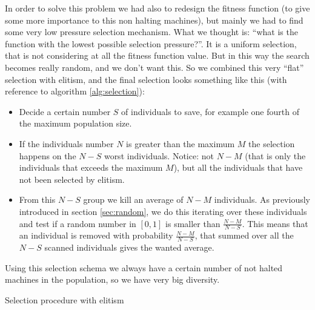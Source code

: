 \documentclass{report}
\begin{document}
In order to solve this problem we had also to redesign the fitness function (to give some more importance to this non halting machines), but mainly we had to find some very low pressure selection mechanism.
What we thought is: ``what is the function with the lowest possible selection pressure?''. It is a uniform selection, that is not considering at all the fitness function value. But in this way the search becomes really random, and we don't want this. So we combined this very ``flat'' selection with elitism, and the final selection looks something like this (with reference to algorithm \ref{alg:selection}):

\begin{itemize}
\item Decide a certain number $S$ of individuals to save, for example one fourth of the maximum population size.
\item If the individuals number $N$ is greater than the maximum $M$ the selection happens on the $N-S$ worst individuals. Notice: not $N-M$ (that is only the individuals that exceeds the maximum $M$), but all the individuals that have not been selected by elitism.
\item From this $N-S$ group we kill an average of $N-M$ individuals. As previously introduced in section
\ref{sec:random}, we do this iterating over these individuals and test if a random number in $[0,1]$ is smaller than $\frac{N-M}{N-S}$. This means that an individual is removed with probability $\frac{N-M}{N-S}$, that summed over all the $N-S$ scanned individuals gives the wanted average.
\end{itemize}

Using this selection schema we always have a certain number of not halted machines in the population, so we have very big diversity.

\begin{algorithm}[t]
\caption[Selection procedure]{Selection procedure with elitism}
\label{alg:selection}

\Begin{
	\For{$i\leftarrow 0$ \KwTo $N-1$}{
		\If{$p[i]$ is a new individual, or is changed}{
			$p[i].value \leftarrow$ \emph{updated fitness value of $p[i]$}\;
		}
	}
	\BlankLine
	\emph{sort $p$ based on the fitness values}\;
	\BlankLine
	\If{$ N < M $}{
		\Return{}\;
	}
	\BlankLine
	$threshold = \frac{N-M}{N-S}$\;
	\For{$i\leftarrow S$ \KwTo $N-1$}{
		\If{\random{} $< threshold$}{
			\emph{erase $i$};
		}
	}
}
\end{algorithm}
\end{document}

